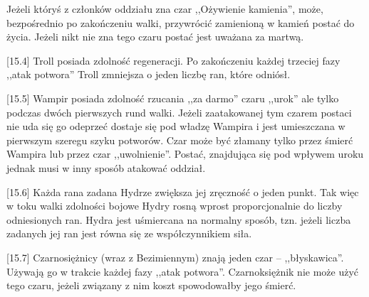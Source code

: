 Jeżeli któryś z członków oddziału zna czar ,,Ożywienie kamienia'', może, bezpośrednio po zakończeniu walki, przywrócić zamienioną w kamień postać do życia.
Jeżeli nikt nie zna tego czaru postać jest uważana za martwą.

[15.4] Troll posiada zdolność regeneracji.
Po zakończeniu każdej trzeciej fazy ,,atak potwora'' Troll zmniejsza o jeden liczbę ran, które odniósł.

[15.5] Wampir posiada zdolność rzucania ,,za darmo'' czaru ,,urok'' ale tylko podczas dwóch pierwszych rund walki.
Jeżeli zaatakowanej tym czarem postaci nie uda się go odeprzeć dostaje się pod władzę Wampira i jest umieszczana w pierwszym szeregu szyku potworów.
Czar może być złamany tylko przez śmierć Wampira lub przez czar ,,uwolnienie''.
Postać, znajdująca się pod wpływem uroku jednak musi w inny sposób atakować oddział.

[15.6] Każda rana zadana Hydrze zwiększa jej zręczność o jeden punkt.
Tak więc w toku walki zdolności bojowe Hydry rosną wprost proporcjonalnie do liczby odniesionych ran.
Hydra jest uśmiercana na normalny sposób, tzn. jeżeli liczba zadanych jej ran jest równa się ze współczynnikiem siła.

[15.7] Czarnosiężnicy (wraz z Bezimiennym) znają jeden czar – ,,błyskawica''.
Używają go w trakcie każdej fazy ,,atak potwora''.
Czarnoksiężnik nie może użyć tego czaru, jeżeli związany z nim koszt spowodowałby jego śmierć.
